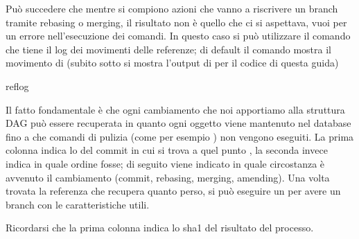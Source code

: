 Pu\`o succedere che mentre si compiono azioni che vanno a riscrivere un branch
tramite rebasing o merging, il risultato non \`e quello che ci si aspettava,
vuoi per un errore nell'esecuzione dei comandi. In questo caso si pu\`o
utilizzare il comando  che tiene il log dei movimenti delle
referenze; di default il comando mostra il movimento di  (subito
sotto si mostra l'output di  per il codice di questa guida)

 reflog

Il fatto fondamentale \`e che ogni cambiamento che noi apportiamo alla struttura
DAG pu\`o essere recuperata in quanto ogni oggetto viene mantenuto nel database
fino a che comandi di pulizia (come per esempio ) non vengono eseguiti.
La prima colonna indica lo  del commit in cui si trova a quel punto
, la seconda invece indica in quale ordine fosse; di seguito viene
indicato in quale circostanza \`e avvenuto il cambiamento (commit, rebasing,
merging, amending). Una volta trovata la referenza che recupera quanto perso, si
pu\`o eseguire un  per avere un branch con
le caratteristiche utili.

Ricordarsi che la prima colonna indica lo sha1 del risultato del processo.
